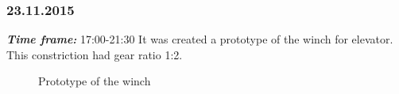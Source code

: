\subsubsection{23.11.2015}
\textit{\textbf{Time frame:}} 17:00-21:30 \newline
It was created a prototype of the winch for elevator. This constriction had gear ratio 1:2.

\begin{figure}[H]
	\begin{minipage}[h]{1\linewidth}
		\caption{Prototype of the winch}
	\end{minipage}
\end{figure}

